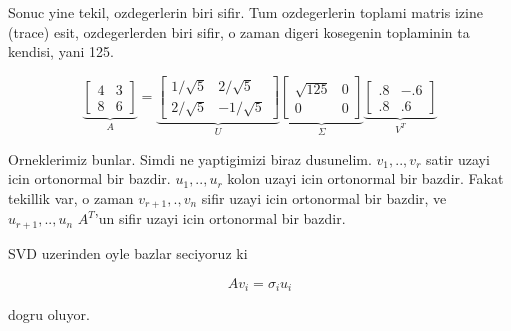 \documentclass[12pt,fleqn]{article}\usepackage{../common}
\begin{document}
Sonuc yine tekil, ozdegerlerin biri sifir. Tum ozdegerlerin toplami matris izine
(trace) esit, ozdegerlerden biri sifir, o zaman digeri kosegenin toplaminin
ta kendisi, yani 125. 

\[ 
\underbrace{
\left[\begin{array}{rr}
4 & 3 \\ 8 & 6
\end{array}\right] 
}_{A}
=
\underbrace{
\left[\begin{array}{rr}
1/\sqrt{ 5} & 2/\sqrt{5} \\ 2/\sqrt{ 5} & -1/\sqrt{5}
\end{array}\right]
}_{U}
\underbrace{
\left[\begin{array}{rr}
\sqrt{ 125} & 0 \\ 0 & 0
\end{array}\right]
}_{\Sigma}
\underbrace{
\left[\begin{array}{rr}
.8 & -.6 \\
.8 & .6 
\end{array}\right]
}_{V^T}
 \]


Orneklerimiz bunlar. Simdi ne yaptigimizi biraz dusunelim. $v_1,..,v_r$
satir uzayi icin ortonormal bir bazdir. $u_1,..,u_r$ kolon uzayi icin
ortonormal bir bazdir. Fakat tekillik var, o zaman $v_{r+1},.,v_n$ sifir
uzayi icin ortonormal bir bazdir, ve $u_{r+1},..,u_n$ $A^T$'un sifir
uzayi icin ortonormal bir bazdir. 

SVD uzerinden oyle bazlar seciyoruz ki 

\[ Av_i = \sigma_i u_i \]

dogru oluyor. 
\end{document}
